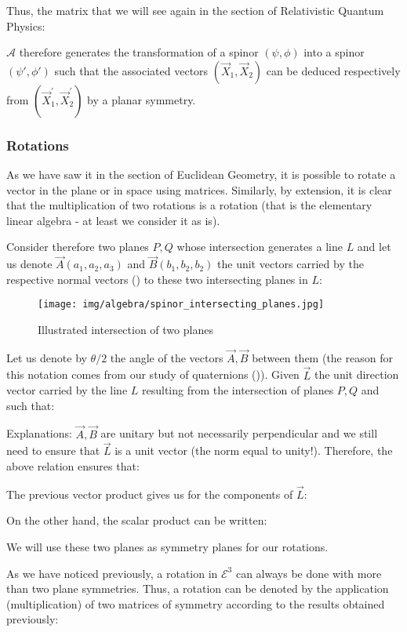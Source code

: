 	Thus, the matrix that we will see again in the section of Relativistic Quantum Physics:
	
	$\mathcal{A}$ therefore generates the transformation of a spinor $(\psi,\phi)$ into a spinor $(\psi',\phi')$ such that the associated vectors $(\vec{X}_1,\vec{X}_2)$ can be deduced respectively from $(\vec{X}_1^{\prime},\vec{X}_2^{\prime})$  by a planar symmetry.
	
	\subsubsection{Rotations}
	As we have saw it in the section of Euclidean Geometry, it is possible to rotate a vector in the plane or in space using matrices. Similarly, by extension, it is clear that the multiplication of two rotations is a rotation (that is the elementary linear algebra - at least we consider it as is).
	
	Consider therefore two planes $P, Q$ whose intersection generates a line $L$ and let us denote $\vec{A}(a_1,a_2,a_3)$ and $\vec{B}(b_1,b_2,b_2)$ the unit vectors carried by the respective normal vectors () to these two intersecting planes in $L$:
	\begin{figure}[H]
		\centering
		\texttt{[image: img/algebra/spinor\_intersecting\_planes.jpg]}
		\caption[]{Illustrated intersection of two planes}
	\end{figure}
	Let us denote by $\theta/2$ the angle of the vectors $\vec{A},\vec{B}$ between them (the reason for this notation comes from our study of quaternions ()). Given $\vec{L}$ the unit direction vector carried by the line $L$ resulting from the intersection of planes $P, Q$ and such that:
	
	Explanations: $\vec{A},\vec{B}$ are unitary but not necessarily perpendicular and we still need to ensure that $\vec{L}$ is a unit vector (the norm equal to unity!). Therefore, the above relation ensures that:
	
	The previous vector product gives us for the components of $\vec{L}$:
	
	On the other hand, the scalar product can be written:	
	
	\begin{tcolorbox}[title=Remark,colframe=black,arc=10pt]
	We will use these two planes as symmetry planes for our rotations.
	\end{tcolorbox}	
	As we have noticed previously, a rotation in $\mathcal{E}^3$ can always be done with more than two plane symmetries. Thus, a rotation can be denoted by the application (multiplication) of two matrices of symmetry according to the results obtained previously:
	
